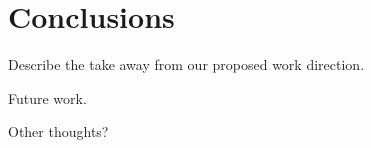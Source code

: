 \section{Conclusions}

Describe the take away from our proposed work direction.

Future work.

Other thoughts?

